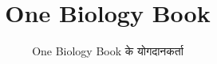 \documentclass[11pt,a4paper,twoside,openany]{book}
\title{One Biology Book}
\author{One Biology Book के योगदानकर्ता}
\date{\bookdate}
\begin{document}
\frontmatter




\tableofcontents

\mainmatter



\appendix
\part{\omsolutionspart}


\backmatter
\printindex
\end{document}
